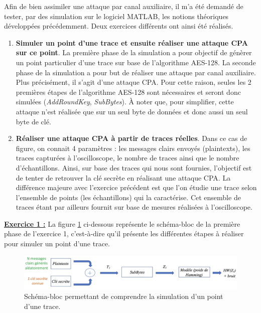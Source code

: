 \documentclass[10pt, oneside, a4paper]{article}
\begin{document}
Afin de bien assimiler une attaque par canal auxiliaire, il m'a été demandé de tester, par des simulation sur le logiciel MATLAB, les notions théoriques développées précédemment. Deux exercices différents ont ainsi été réalisés. 
\begin{enumerate}
\item \textbf{Simuler un point d'une trace et ensuite réaliser une attaque CPA sur ce point}. La première phase de la simulation a pour objectif de génèrer un point particulier d'une trace sur base de l'algorithme AES-128. La seconde phase de la simulation a pour but de réaliser une attaque par canal auxiliaire. Plus précisément, il s'agit d'une attaque CPA. Pour cette raison, seules les 2 premières étapes de l'algorithme AES-128 sont nécessaires et seront donc simulées (\textit{AddRoundKey}, \textit{SubBytes}). À noter que, pour simplifier, cette attaque n'est réalisée que sur un seul byte de données et donc aussi un seul byte de clé.
\item \textbf{Réaliser une attaque CPA à partir de traces réelles}. Dans ce cas de figure, on connait 4 paramètres : les messages clairs envoyés (plaintexts), les traces capturées à l'oscilloscope, le nombre de traces ainsi que le nombre d'échantillons. Ainsi, sur base des traces qui nous sont fournies, l'objectif est de tenter de retrouver la clé secrète en réalisant une attaque CPA. La différence majeure avec l'exercice précédent est que l'on étudie une trace selon l'ensemble de points (les échantillons) qui la caractérise. Cet ensemble de traces étant par ailleurs fournit sur base de mesures réalisées à l'oscilloscope. \\
\end{enumerate}

\hspace{-0.5 cm}\textbf{\underline{Exercice 1 :}} La figure \ref{fig:simul1} ci-dessous représente le schéma-bloc de la première phase de l'exercice 1, c'est-à-dire qu'il présente les différentes étapes à réaliser pour simuler un point d'une trace.
\begin{figure}[htbp]
    \centering
    \includegraphics[scale=0.45]{image/simul1}
    \caption{Schéma-bloc permettant de comprendre la simulation d'un point d'une trace.}
    \label{fig:simul1} 
\end{figure}
\end{document}
